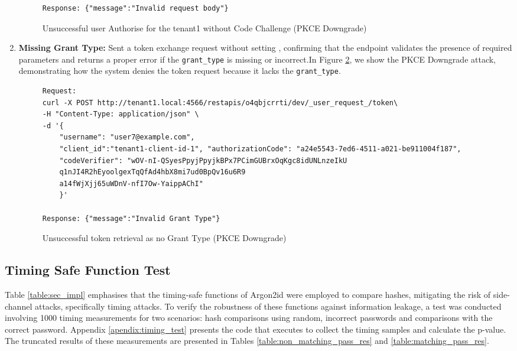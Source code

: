 \begin{enumerate}
\begin{figure}[!htbp]
\begin{lstlisting}[style=curlstyle]
Response: {"message":"Invalid request body"}
    \end{lstlisting}
    \caption{Unsuccessful user Authorise for the tenant1 without Code Challenge (PKCE Downgrade)}
    \label{fig:authorize_tenant_1_without_code_challenge}
\end{figure}

    \newpage
    \item \textbf{Missing Grant Type:} Sent a token exchange request without setting  \sloppy {}, confirming that the endpoint validates the presence of required parameters and returns a proper error if the \texttt{grant\_type} is missing or incorrect.In Figure \ref{fig:token_no_grant_type}, we show the PKCE Downgrade attack, demonstrating how the system denies the token request because it lacks the \texttt{grant\_type}.


                \begin{figure}[!htbp]
    \centering
    \begin{lstlisting}[style=curlstyle]
Request:
curl -X POST http://tenant1.local:4566/restapis/o4qbjcrrti/dev/_user_request_/token\                                      
-H "Content-Type: application/json" \
-d '{
    "username": "user7@example.com",
    "client_id":"tenant1-client-id-1", "authorizationCode": "a24e5543-7ed6-4511-a021-be911004f187",
    "codeVerifier": "wOV-nI-QSyesPpyjPpyjkBPx7PCimGUBrxOqKgc8idUNLnzeIkU
    q1nJI4R2hEyoolgexTqQfAd4hbX8mi7ud0BpQv16u6R9
    a14fWjXjj65uWDnV-nfI7Ow-YaippAChI"
    }'

Response: {"message":"Invalid Grant Type"}
    \end{lstlisting}
    \caption{Unsuccessful token retrieval as no Grant Type (PKCE Downgrade)}
    \label{fig:token_no_grant_type}
\end{figure}
\end{enumerate}
       


\subsection{Timing Safe Function Test}
\label{sec:timing_test}
Table \ref{table:sec_impl} emphasises that the timing-safe functions of Argon2id were employed to compare hashes, mitigating the risk of side-channel attacks, specifically timing attacks. To verify the robustness of these functions against information leakage, a test was conducted involving 1000 timing measurements for two scenarios: hash comparisons using random, incorrect passwords and comparisons with the correct password. Appendix \ref{apendix:timing_test} presents the code that executes to collect the timing samples and calculate the p-value. The truncated results of these measurements are presented in Tables \ref{table:non_matching_pass_res} and \ref{table:matching_pass_res}.

